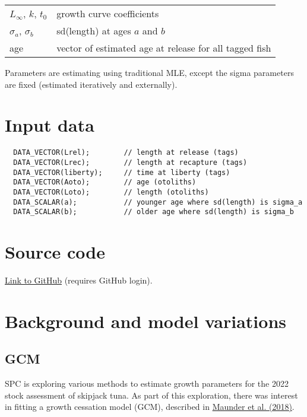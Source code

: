 \documentclass[fleqn]{article}
\begin{document}
\begin{tabular}{ll}
  $L_\infty$, $k$, $t_0$ & growth curve coefficients\\[1ex]
  $\sigma_a$, $\sigma_b$ & sd(length) at ages $a$ and $b$\\[1ex]
  age & vector of estimated age at release for all tagged fish\\[1ex]
\end{tabular}

Parameters are estimating using traditional MLE, except the sigma parameters are
fixed (estimated iteratively and externally).

\section*{Input data}

\begin{verbatim}
  DATA_VECTOR(Lrel);        // length at release (tags)
  DATA_VECTOR(Lrec);        // length at recapture (tags)
  DATA_VECTOR(liberty);     // time at liberty (tags)
  DATA_VECTOR(Aoto);        // age (otoliths)
  DATA_VECTOR(Loto);        // length (otoliths)
  DATA_SCALAR(a);           // younger age where sd(length) is sigma_a
  DATA_SCALAR(b);           // older age where sd(length) is sigma_b
\end{verbatim}

\section*{Source code}

\textcolor[rgb]{0,0.1,0.5}%
{\href{https://github.com/PacificCommunity/ofp-sam-skj-tag-growth/blob/main/bootstrap/initial/software}%
  {Link to GitHub}} (requires GitHub login).

\section*{Background and model variations}

\subsection*{GCM}

SPC is exploring various methods to estimate growth parameters for the 2022
stock assessment of skipjack tuna. As part of this exploration, there was
interest in fitting a growth cessation model (GCM), described in
\textcolor[rgb]{0,0.1,0.5}%
{\href{https://doi.org/10.1007/s00227-018-3336-9}{Maunder et al. (2018)}}.
\end{document}
